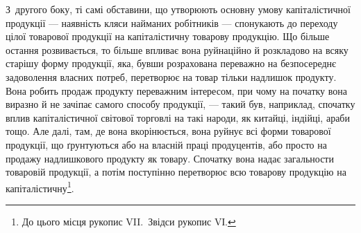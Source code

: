 З~другого боку, ті самі обставини, що утворюють основну умову капіталістичної продукції — наявність
кляси найманих робітників — спонукають до переходу цілої товарової продукції на капіталістичну
товарову продукцію. Що більше остання розвивається, то більше впливає вона руйнаційно й розкладово
на всяку старішу форму продукції, яка, бувши розрахована переважно на безпосереднє задоволення
власних потреб, перетворює на товар тільки надлишок продукту. Вона робить продаж продукту
переважним інтересом, при чому на початку вона виразно й не зачіпає самого способу продукції, —
такий був, наприклад, спочатку вплив капіталістичної світової торговлі на такі народи, як китайці,
індійці, араби тощо. Але далі, там, де вона вкорінюється, вона руйнує всі форми товарової продукції,
що ґрунтуються або на власній праці продуцентів,
або просто на продажу надлишкового продукту як товару. Спочатку
вона надає загальности товаровій продукції, а потім поступінно перетворює
всю товарову продукцію на капіталістичну\footnote{
До цього місця рукопис VII.~Звідси рукопис VІ.}.
